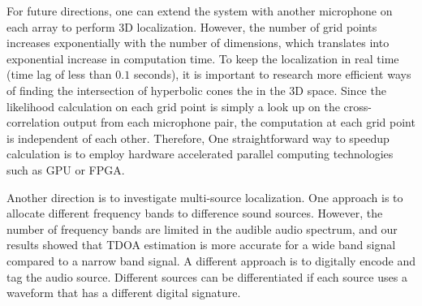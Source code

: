 For future directions, one can extend the system with another microphone on each array to perform 3D localization. However, the number of grid points increases exponentially with the number of dimensions, which translates into exponential increase in computation time. To keep the localization in real time (time lag of less than $0.1$ seconds), it is important to research more efficient ways of finding the intersection of hyperbolic cones the in the 3D space. Since the likelihood calculation on each grid point is simply a look up on the cross-correlation output from each microphone pair, the computation at each grid point is independent of each other. Therefore, One straightforward way to speedup calculation is to employ hardware accelerated parallel computing technologies such as GPU or FPGA. 

Another direction is to investigate multi-source localization. One approach is to allocate different frequency bands to difference sound sources. However, the number of frequency bands are limited in the audible audio spectrum, and our results showed that TDOA estimation is more accurate for a wide band signal compared to a narrow band signal. A different approach is to digitally encode and tag the audio source. Different sources can be differentiated if each source uses a waveform that has a different digital signature.
